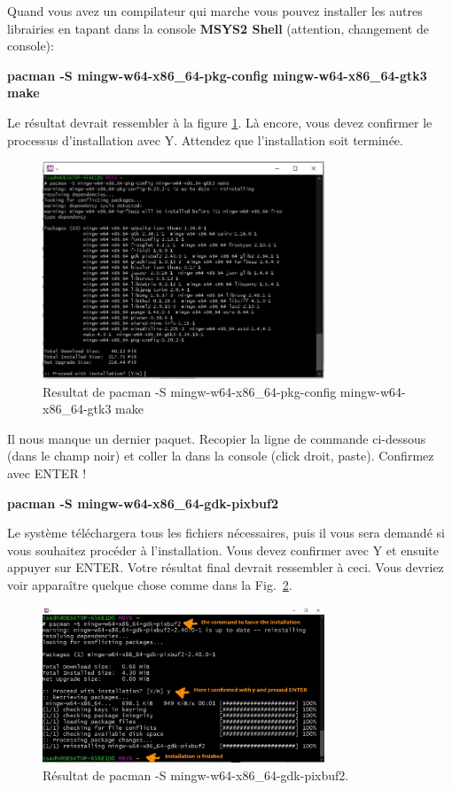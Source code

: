 \documentclass{article}
\newcommand\fig[1]{{Fig.~\ref{#1}}}
\begin{document}
Quand vous avez un compilateur qui marche vous pouvez installer les autres librairies en tapant dans la console {\color{Purple}\textbf{MSYS2 Shell}} (attention, changement de console):
\begin{tcolorbox}[width=\textwidth,colframe=Purple,colback={black},title={Ceci est la console MSYS2 Shell},outer arc=0mm,colupper=white]    
      \large\textbf{pacman -S mingw-w64-x86\_64-pkg-config mingw-w64-x86\_64-gtk3 make}
\end{tcolorbox}
Le résultat devrait ressembler à la figure \ref{F:gtkInstal}. Là encore, vous devez confirmer le processus d'installation avec Y. Attendez que l'installation soit terminée.
\begin{figure}[H]
\center
\includegraphics[width=0.75\textwidth]{Plots/Msys2_14pkg.jpg}
\caption{Resultat de pacman -S mingw-w64-x86\_64-pkg-config mingw-w64-x86\_64-gtk3 make\label{F:gtkInstal}}
\end{figure}

Il nous manque un dernier paquet. Recopier la ligne de commande ci-dessous (dans le champ noir) et coller la dans la console (click droit, paste). Confirmez avec ENTER !
\begin{tcolorbox}[width=\textwidth,colframe=Purple,colback={black},title={Ceci est la console MSYS2 Shell},outer arc=0mm,colupper=white]    
      \large\textbf{pacman -S mingw-w64-x86\_64-gdk-pixbuf2}
\end{tcolorbox}
Le système téléchargera tous les fichiers nécessaires, puis il vous sera demandé si vous souhaitez procéder à l'installation. Vous devez confirmer avec Y et ensuite appuyer sur ENTER. Votre résultat final devrait ressembler à ceci.
Vous devriez voir apparaître quelque chose comme dans la \fig{F:pixbuf2}.
\begin{figure}[H]
\center
\includegraphics[width=0.75\textwidth]{Plots/Pixbuf.jpeg}
\caption{Résultat de pacman -S mingw-w64-x86\_64-gdk-pixbuf2.\label{F:pixbuf2}}
\end{figure}
\end{document}
